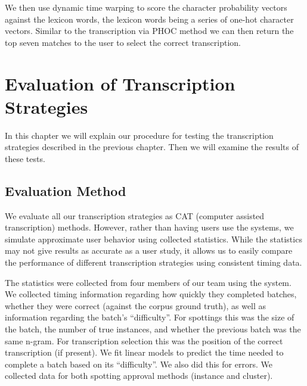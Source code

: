 \documentclass[ms,electronic,twosidetoc,letterpaper,chaptercenter,parttop,lof,lot]{byumsphd}
\begin{document}
We then use dynamic time warping to score the character probability vectors against the lexicon words, the lexicon words being a series of one-hot character vectors. Similar to the transcription via PHOC method we can then return the top seven matches to the user to select the correct transcription.




\chapter{Evaluation of Transcription Strategies}

In this chapter we will explain our procedure for testing the transcription strategies described in the previous chapter. Then we will examine the results of these tests.

\section{Evaluation Method}

We evaluate all our transcription strategies as CAT (computer assisted transcription) methods. However, rather than having users use the systems, we simulate approximate user behavior using collected statistics. While the statistics may not give results as accurate as a user study, it allows us to easily compare the performance of different transcription strategies using consistent timing data.

The statistics were collected from four members of our team
using the system. We collected timing information regarding how quickly they completed batches, whether they were correct (against the corpus ground truth),
 as well as information regarding the batch's ``difficulty''. For spottings this was the size of the batch, the number of true instances, and whether the previous batch was the same n-gram. For transcription selection this was the position of the correct transcription (if present). 
We fit linear models to predict the time needed to complete a batch based on its ``difficulty''. We also did this for errors.
We collected data for both spotting approval methods (instance and cluster).
\end{document}

